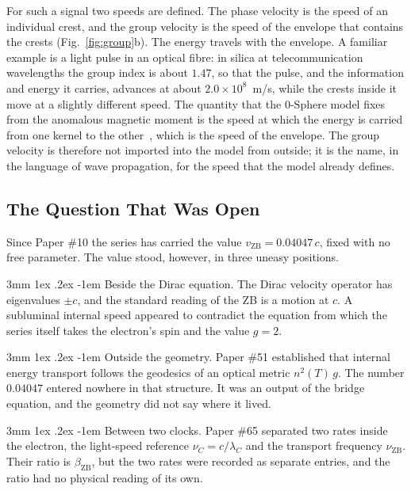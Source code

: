 \documentclass[%
 reprint, amsmath,amssymb, aps, prb, ]{revtex4-2}
\makeatletter
\numberwithin{equation}{section}
\renewcommand\paragraph{%
  \@startsection{paragraph}{4}{\z@}%
    {3mm \@plus 1ex \@minus .2ex}%
    {-1em}%
    {\normalfont\normalsize\itshape}}
\makeatother
\begin{document}
For such a signal two speeds are defined. The phase velocity is the speed of an individual crest, and the group velocity is the speed of the envelope that contains the crests (Fig.~\ref{fig:group}b). The energy travels with the envelope. A familiar example is a light pulse in an optical fibre: in silica at telecommunication wavelengths the group index is about $1.47$, so that the pulse, and the information and energy it carries, advances at about $2.0\times10^{8}$~m/s, while the crests inside it move at a slightly different speed. The quantity that the 0-Sphere model fixes from the anomalous magnetic moment is the speed at which the energy is carried from one kernel to the other~\cite{H65}, which is the speed of the envelope. The group velocity is therefore not imported into the model from outside; it is the name, in the language of wave propagation, for the speed that the model already defines.

\subsection{The Question That Was Open}
\label{app:why_open}

Since Paper \#10 the series has carried the value $v_{\text{ZB}} = 0.04047\,c$, fixed with no free parameter. The value stood, however, in three uneasy positions.

\paragraph{Beside the Dirac equation.} The Dirac velocity operator has eigenvalues $\pm c$, and the standard reading of the ZB is a motion at $c$. A subluminal internal speed appeared to contradict the equation from which the series itself takes the electron's spin and the value $g = 2$.

\paragraph{Outside the geometry.} Paper \#51 established that internal energy transport follows the geodesics of an optical metric $n^2(T)\,g$. The number $0.04047$ entered nowhere in that structure. It was an output of the bridge equation, and the geometry did not say where it lived.

\paragraph{Between two clocks.} Paper \#65 separated two rates inside the electron, the light-speed reference $\nu_C = c/\lambda_C$ and the transport frequency $\nu_{\text{ZB}}$. Their ratio is $\beta_{\text{ZB}}$, but the two rates were recorded as separate entries, and the ratio had no physical reading of its own.
\end{document}
